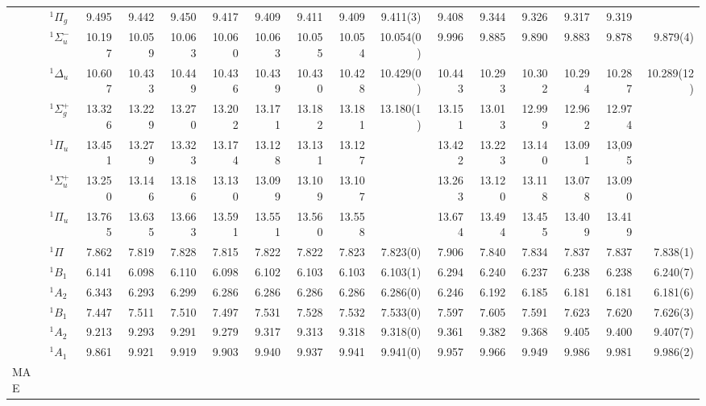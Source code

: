 \documentclass[aip,jcp,reprint,noshowkeys,superscriptaddress]{revtex4-1}
\begin{document}
\begin{squeezetable}
\begin{table*}
\begin{ruledtabular}
\begin{tabular}{llrrrrrrrrrrrrrr}
	\ce{N2}		&	$^1\Pi_g$  		&9.495	&9.442	&9.450	&9.417	&9.409	&9.411	&9.409	&9.411(3)	&9.408	&9.344	&9.326	&9.317	&9.319	&	\\
				&	$^1\Sigma_u^-$	&10.197	&10.059	&10.063	&10.060	&10.063	&10.055	&10.054	&10.054(0)	&9.996	&9.885	&9.890	&9.883	&9.878	&9.879(4)\\
				&	$^1\Delta_u$ 	&10.607	&10.433	&10.449	&10.436	&10.439	&10.430	&10.428	&10.429(0)	&10.443	&10.293	&10.302	&10.294	&10.287	&10.289(12)\\
				&	$^1\Sigma_g^+$	&13.326	&13.229	&13.270	&13.202	&13.171	&13.182	&13.181	&13.180(1)	&13.151	&13.013	&12.999	&12.962	&12.974	&	\\
				&	$^1\Pi_u$  		&13.451	&13.279	&13.323	&13.174	&13.128	&13.131	&13.127	&			&13.422	&13.223	&13.140	&13.091	&13,095	&	\\
				&	$^1\Sigma_u^+$	&13.250	&13.146	&13.186	&13.130	&13.099	&13.109	&13.107	&			&13.263	&13.120	&13.118	&13.078	&13.090	&	\\
				&	$^1\Pi_u$ 		&13.765	&13.635	&13.663	&13.591	&13.551	&13.560	&13.558	&			&13.674	&13.494	&13.455	&13.409	&13.419\\
	\ce{HCl}	&	$^1\Pi$ 		&7.862	&7.819	&7.828	&7.815	&7.822	&7.822	&7.823	&7.823(0)	&7.906	&7.840	&7.834	&7.837	&7.837	&7.838(1)\\
	\ce{H2S}	&	$^1B_1$  		&6.141	&6.098	&6.110	&6.098	&6.102	&6.103	&6.103	&6.103(1)	&6.294	&6.240	&6.237	&6.238	&6.238	&6.240(7)\\
				&	$^1A_2$  		&6.343	&6.293	&6.299	&6.286	&6.286	&6.286	&6.286	&6.286(0)	&6.246	&6.192	&6.185	&6.181	&6.181	&6.181(6) \\
	\ce{H2O}	&	$^1B_1$  		&7.447	&7.511	&7.510	&7.497	&7.531	&7.528	&7.532	&7.533(0)	&7.597	&7.605	&7.591	&7.623	&7.620	&7.626(3)\\
				&	$^1A_2$  		&9.213	&9.293	&9.291	&9.279	&9.317	&9.313	&9.318	&9.318(0)	&9.361	&9.382	&9.368	&9.405	&9.400	&9.407(7)\\
				&	$^1A_1$  		&9.861	&9.921	&9.919	&9.903	&9.940	&9.937	&9.941	&9.941(0)	&9.957	&9.966	&9.949	&9.986	&9.981	&9.986(2)\\
	\hline
	MAE			&					&	\\
	\end{tabular}
	\end{ruledtabular}
\end{table*}
\end{squeezetable}
\end{document}
